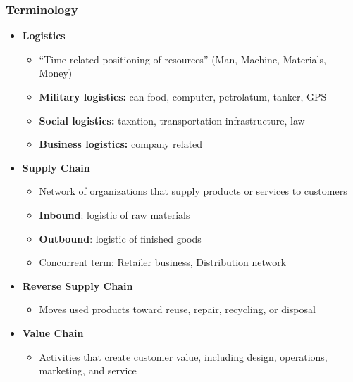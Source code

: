 \documentclass[10pt,handout]{beamer}
\begin{document}
  \begin{frame}
    \frametitle{Terminology}
      \begin{itemize}
        \item<1-> \textbf{Logistics}
        \begin{itemize}
          \item<2-> ``Time related positioning of \alert{resources}'' (Man, Machine, Materials, Money)
          \item<2-> \textbf{Military logistics:} can food, computer, petrolatum, tanker, GPS
          \item<2-> \textbf{Social logistics:} taxation, transportation infrastructure, law
          \item<2-> \textbf{Business logistics:} company related \NextHalfLine
        \end{itemize}
        \item<1-> \textbf{Supply Chain}
        \begin{itemize}
          \item<3-> Network of organizations that supply products or services to customers
          \item<3-> \textbf{Inbound}: logistic of \alert{raw materials}
          \item<3-> \textbf{Outbound}: logistic of \alert{finished goods}
          \item<3-> Concurrent term: Retailer business, Distribution network \NextHalfLine
        \end{itemize}
        \item<1-> \textbf{Reverse Supply Chain}
        \begin{itemize}
          \item<3-> Moves \alert{used products} toward reuse, repair, recycling, or disposal \NextLine
        \end{itemize}
        \item<1-> \textbf{Value Chain}
        \begin{itemize}
          \item<4-> Activities that create customer value, including design, operations, marketing, and service
        \end{itemize}
    \end{itemize}


\end{frame}
\end{document}
